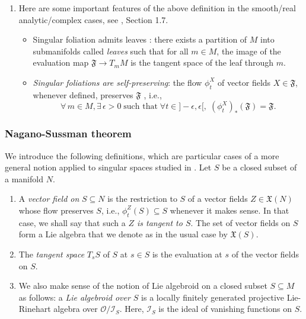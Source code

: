 \documentclass[10pt]{article}
\theoremstyle{plain}
\theoremstyle{definition}
\theoremstyle{remark}
\begin{document}
\begin{enumerate}
\begin{enumerate}
\end{enumerate}

\item Here are some important features of the above definition in the smooth/real analytic/complex cases, see \cite{LLL}, Section 1.7.
\begin{itemize}
     \item[-] Singular foliation admits leaves : there exists a partition of $M$ into submanifolds called \emph{leaves} such that for all $m\in M$, the image of the evaluation map $\mathfrak F \to T_m M  $  is the tangent space of the leaf through $m$.
     \item[-] \emph{Singular foliations are self-preserving}: the flow $\phi^X_t$ of vector fields $X\in\mathfrak F $, whenever defined, preserves $\mathfrak F$ \cite{Hermann, AndroulidakisIakovos,GarmendiaAlfonso}, i.e., \begin{equation*}
         \forall\, m\in M, \exists\, \epsilon >0\; \text{such that}\; \forall t\in ]-\epsilon,\epsilon[, \; {(\phi^X_t)}_*(\mathfrak F)=\mathfrak F.
     \end{equation*}
\end{itemize}
\end{enumerate}
\subsubsection{Nagano-Sussman theorem}\label{Nagano}
We introduce the following definitions, which are particular cases of a more general notion applied to singular spaces studied in  \cite{Sniatycki}.  Let $S$ be a closed subset of a manifold $N$.
\begin{enumerate}
 \item \label{def:tangent}A \emph{vector field on} $S\subseteq N$  is the restriction to $S$ of a vector fields $Z\in \mathfrak X(N)$  whose flow preserves $S$, i.e., $\phi^{Z}_t(S)\subseteq S$ whenever it makes sense. In that case, we shall say that such a \emph{$Z$ is tangent to $S$}. The set of vector fields on $S$ form a Lie algebra that we  denote as in the usual case by $\mathfrak X(S)$.
        \item The \emph{tangent space} $T_sS$  of $S$ at $s\in  S$ is the evaluation at $s$ of the vector fields on $S$.
        \item \label{ref:LA} We also make sense of the notion of Lie algebroid on a closed subset  $S\subseteq M$ as follows: a \emph{Lie algebroid over $S$} is a locally finitely generated projective Lie-Rinehart algebra over $\mathcal{O}/\mathcal{I}_S$. Here, $\mathcal{I}_S$ is the ideal of vanishing functions on $S$.
\end{enumerate}
\end{document}
